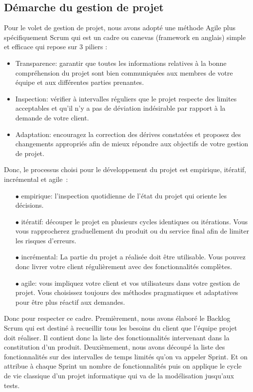 \subsection{Démarche du gestion de projet} %
\label{sub:démarche_du_gestion_de_projet}
Pour le volet de gestion de projet, nous avons adopté une méthode Agile plus spécifiquement Scrum qui est un cadre ou canevas (framework en anglais) simple et efficace qui repose sur 3 piliers :
\begin{itemize}
	\item Transparence: garantir que toutes les informations relatives à la bonne compréhension du projet sont bien communiquées aux membres de votre équipe et aux différentes parties prenantes.
	\item Inspection: vérifier à intervalles réguliers que le projet respecte des limites acceptables et qu’il n’y a pas de déviation indésirable par rapport à la demande de votre client.
	\item Adaptation: encouragez la correction des dérives constatées et proposez des changements appropriés afin de mieux répondre aux objectifs de votre gestion de projet.
\end{itemize}
Donc, le processus choisi pour le développement du projet est empirique, itératif, incrémental et agile : 
\begin{itemize}
	\item[$\bullet$] empirique: l'inspection quotidienne de l'état du projet qui oriente les décisions.
	\item[$\bullet$] itératif: découper le projet en plusieurs cycles identiques ou itérations. Vous vous rapprocherez graduellement du produit ou du service final afin de limiter les risques d'erreurs.
	\item[$\bullet$] incrémental: La partie du projet a réalisée doit être utilisable. Vous pouvez donc livrer votre client régulièrement avec des fonctionnalités complètes.
	\item[$\bullet$] agile: vous impliquez votre client et vos utilisateurs dans votre gestion de projet. Vous choisissez toujours des méthodes pragmatiques et adaptatives pour être plus réactif aux demandes.
\end{itemize}
Donc pour respecter ce cadre. Premièrement, nous avons élaboré le Backlog Scrum qui est destiné à recueillir tous les besoins du client que l'équipe projet doit réaliser. Il contient donc la liste des fonctionnalités intervenant dans la constitution d'un produit.
Deuxièmement, nous avons découpé la liste des fonctionnalités sur des intervalles de temps limités qu'on va appeler Sprint. Et on attribue à chaque Sprint un nombre de fonctionnalités puis on applique le cycle de vie classique d'un projet informatique qui va de la modélisation jusqu'aux tests.\newline
{}

